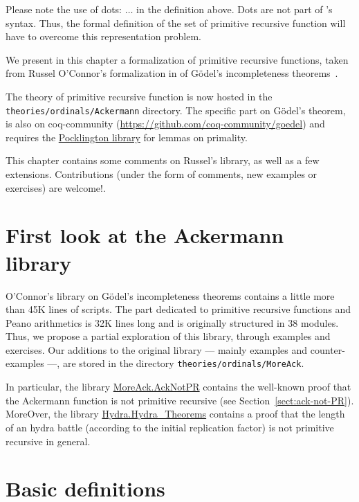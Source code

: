 Please note the use of dots: $\ldots$ in the definition above. 
Dots are not part of \gallina's syntax. Thus, the formal definition of the set of primitive recursive function will have to overcome this representation problem.

  We present in this chapter a formalization of  primitive recursive functions, taken from  Russel O'Connor's formalization in \coq{} of
G\"odel's incompleteness theorems~\cite{OConnor05}.

\begin{remark}
 The theory of primitive recursive function is now hosted in
the \texttt{theories/ordinals/Ackermann} directory.
The specific part on G\"odel's theorem,  is also on
coq-community (\url{https://github.com/coq-community/goedel}) and requires the 
\href{https://github.com/coq-community/pocklington}{Pocklington library} for lemmas on primality.
\end{remark}

This chapter contains some comments on Russel's library, as well as a few extensions.
Contributions (under the form of comments, new examples or exercises) are welcome!. 



\section{First look at the Ackermann library}

O'Connor's library on Gödel's incompleteness theorems contains a little more 
than 45K lines of scripts. The part dedicated to primitive recursive functions and Peano arithmetics is 32K lines long and is originally structured in 38 modules.
Thus, we propose a partial exploration of this library, through examples and exercises. Our additions to the original library --- mainly examples and counter-examples ---,
are stored in the directory \texttt{theories/ordinals/MoreAck}.

In particular, the library \href{../theories/html/hydras.MoreAck.AckNotPR.html}{MoreAck.AckNotPR} contains the well-known  proof that the Ackermann function is not primitive recursive (see Section~\vref{sect:ack-not-PR}).
MoreOver, the library \href{../theories/html/hydras.Hydra.Hydra_Theorems.html}{Hydra.Hydra\_Theorems} contains 
a proof that the length of an hydra battle (according to the initial replication factor) is not primitive recursive in general.

\section{Basic definitions}


